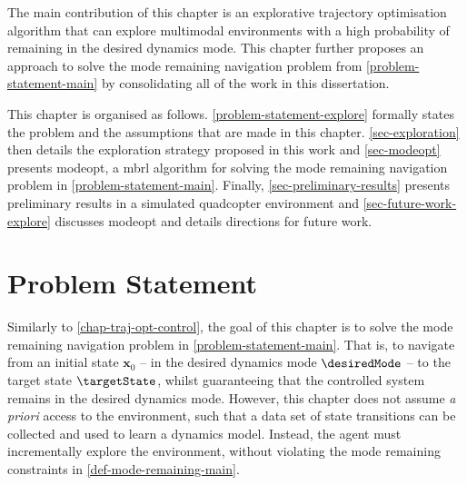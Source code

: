 \documentclass{mimosis-class/mimosis}
\numberwithin{equation}{chapter}
\newcommand{\state}{\ensuremath{\mathbf{x}}}
\begin{document}
{The main contribution of this chapter is an explorative trajectory optimisation algorithm
that can explore multimodal environments with a high probability of remaining in the desired dynamics mode.
This chapter further proposes an approach to solve the mode remaining navigation problem from \cref{problem-statement-main}
by consolidating all of the work in this dissertation.

This chapter is organised as follows.
\cref{problem-statement-explore} formally states the problem and the assumptions that are made in this chapter.
\cref{sec-exploration} then details the exploration strategy proposed in this work and
\cref{sec-modeopt} presents \acrfull{modeopt}, a \acrshort{mbrl} algorithm for
solving the mode remaining navigation problem in \cref{problem-statement-main}.
Finally, \cref{sec-preliminary-results} presents preliminary results in a simulated
quadcopter environment and \cref{sec-future-work-explore} discusses \acrshort{modeopt} and
details directions for future work.
\section{Problem Statement \label{problem-statement-explore}}
\label{sec:org52768ba}
Similarly to \cref{chap-traj-opt-control}, the goal of this chapter is to solve the mode
remaining navigation problem in \cref{problem-statement-main}.
That is, to navigate from an initial state \(\state_0\) -- in the desired dynamics mode \(\desiredMode\)
-- to the target state \(\targetState\), whilst guaranteeing that the controlled
system remains in the desired dynamics mode.
However, this chapter does not assume \emph{a priori} access to the environment, such that a data set of state transitions
can be collected and used to learn a dynamics model.
Instead, the agent must incrementally explore the environment, without violating the mode remaining constraints
in \cref{def-mode-remaining-main}.

}
\end{document}
